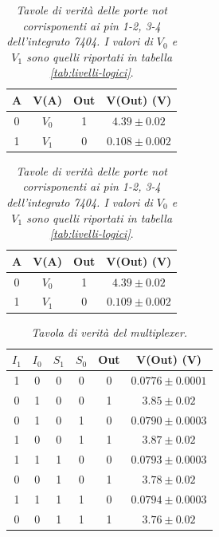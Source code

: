 \begin{table}[H]
  \centering
\begin{subtable}[H]{0.5\textwidth}
    \centering
        \begin{tabular}[t]{c  c | c  c }
      \hline
      A & V(A) & Out & V(Out) (V) \\
      \hline
          0 & $V_{0}$ & 1 & $4.39 \pm 0.02$ \\
      1& $V_{1}$ & 0 & $0.108 \pm 0.002$ \\
      \hline
    \end{tabular}
  \end{subtable}

  \vspace{.5cm}

  \begin{subtable}[H]{0.5\textwidth}
    \centering
        \begin{tabular}[t]{c  c | c  c }
      \hline
      A & V(A) & Out & V(Out) (V) \\
      \hline
      0 & $V_{0}$ & 1 & $4.39 \pm 0.02$ \\
      1& $V_{1}$ & 0 & $0.109 \pm 0.002$ \\
      \hline
    \end{tabular}
  \end{subtable}

  \caption{\emph{Tavole di verità delle porte \emph{not} corrisponenti ai pin 1-2, 3-4 dell'integrato 7404. I valori di $V_{0}$ e $V_{1}$ sono quelli riportati in tabella \ref{tab:livelli-logici}}.}
  \label{tab:not-multiplexer}
\end{table}


\begin{table}[H]
  \centering
  \begin{tabular}{c c | c c | c c }
    \hline
    $I_{1}$ & $I_{0}$ & $S_{1}$ & $S_{0}$ & Out & V(Out) (V) \\
    \hline
    1 & 0 & 0 & 0 & 0 & $0.0776 \pm 0.0001$ \\
    0 & 1 & 0 & 0 & 1 & $3.85 \pm 0.02$ \\
    0 & 1 & 0 & 1 & 0 & $0.0790 \pm 0.0003$ \\
    1 & 0 & 0 & 1 & 1 & $3.87 \pm 0.02$ \\
    1 & 1 & 1 & 0 & 0 & $0.0793 \pm 0.0003$ \\
    0 & 0 & 1 & 0 & 1 & $3.78 \pm 0.02$ \\
    1 & 1 & 1 & 1 & 0 & $0.0794 \pm 0.0003$ \\
    0 & 0 & 1 & 1 & 1 & $3.76 \pm 0.02$ \\
  \end{tabular}
  \caption{\emph{Tavola di verità del multiplexer.}}
  \label{tab:multiplexer}
\end{table}

